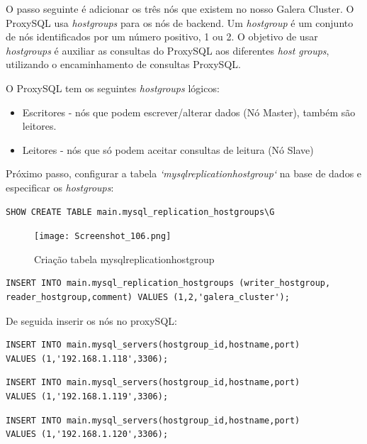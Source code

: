 O passo seguinte é adicionar os três nós que existem no nosso Galera Cluster. O ProxySQL usa \textit{hostgroups} para os nós de backend. Um \textit{hostgroup} é um conjunto de nós identificados por um número positivo, 1 ou 2. O objetivo de usar \textit{hostgroups} é auxiliar as consultas do ProxySQL aos diferentes \textit{host groups}, utilizando o encaminhamento de consultas ProxySQL.

\hfill \break
\indent O ProxySQL tem os seguintes \textit{hostgroups} lógicos:
\begin{itemize}
    \item Escritores - nós que podem escrever/alterar dados (Nó Master), também são leitores. 
    \item Leitores - nós que só podem aceitar consultas de leitura (Nó Slave)
\end{itemize}

\hfill \break
\indent Próximo passo, configurar a tabela \textit{`mysql\textunderscore replication\textunderscore hostgroup`} na base de dados e especificar os \textit{hostgroups}:

\begin{verbatim}SHOW CREATE TABLE main.mysql_replication_hostgroups\G\end{verbatim}

\begin{figure}[H]
\center
\texttt{[image: Screenshot\_106.png]}
\caption{Criação tabela mysql\textunderscore replication\textunderscore hostgroup}
\end{figure}

\hfill \break
\begin{verbatim}INSERT INTO main.mysql_replication_hostgroups (writer_hostgroup,
reader_hostgroup,comment) VALUES (1,2,'galera_cluster');\end{verbatim}

\newpage
De seguida inserir os nós no proxySQL:

\begin{verbatim}INSERT INTO main.mysql_servers(hostgroup_id,hostname,port) 
VALUES (1,'192.168.1.118',3306);\end{verbatim}

\begin{verbatim}INSERT INTO main.mysql_servers(hostgroup_id,hostname,port) 
VALUES (1,'192.168.1.119',3306);\end{verbatim}

\begin{verbatim}INSERT INTO main.mysql_servers(hostgroup_id,hostname,port) 
VALUES (1,'192.168.1.120',3306);\end{verbatim}

